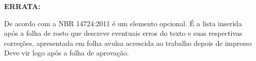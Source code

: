 \newpage
\textbf{ERRATA:}

De acordo com a NBR 14724:2011 é um elemento opcional.
É a lista inserida após a folha de rosto que descreve eventuais erros do texto
e suas respectivas correções, apresentada em folha avulsa acrescida ao
trabalho depois de impresso
Deve vir logo após a folha de aprovação.

\newpage